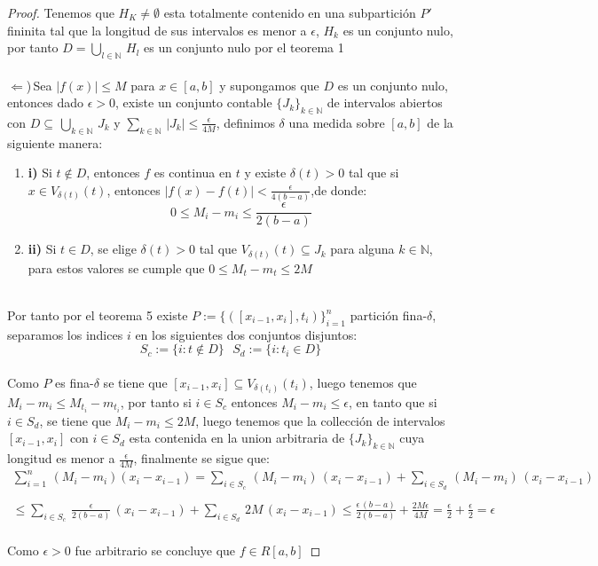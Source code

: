 \documentclass[11pt,letterpaper]{article}
\newcommand{\N}{\mathbb{N}}
\begin{document}
\begin{proof}
    Tenemos que $H_K\neq \emptyset$ esta totalmente contenido en una subpartici\'on $P'$ fininita tal que la longitud de sus intervalos es menor a $\epsilon$,  $H_k$ es un conjunto nulo, por tanto $D=\bigcup_{l\in \N}\,H_l$
    es un conjunto nulo por el teorema 1\,\\
    \,\\
    $\Leftarrow$)\,Sea $|f(x)|\leq M$ para $x\in [a,b]$ y supongamos que $D$ es un conjunto nulo, entonces dado $\epsilon>0$, existe un conjunto contable $\{J_k\}_{k\in \N}$ de intervalos abiertos con $D\subseteq\,\bigcup_{k\in \N}\,J_k$ y $\sum_{k\in \N}\,|J_k|\leq \frac{\epsilon}{4M}$, definimos $\delta$ una medida sobre $[a,b]$ de la siguiente manera:\,\\
    \begin{enumerate}
        \item \textbf{i)}\,\,Si $t \notin D$, entonces $f$ es continua en $t$ y existe $\delta(t)>0$ tal que si $x\in V_{\delta(t)}(t)$, entonces $|f(x)-f(t)|<\frac{\epsilon}{4(b-a)}$,de donde:\,\\
        \begin{equation*}
            0\leq M_i-m_i\leq \frac{\epsilon}{2(b-a)}
        \end{equation*}
        \item \textbf{ii)}\,\,Si $t\in D$, se elige $\delta(t)>0$ tal que $V_{\delta(t)}(t)\subseteq J_k$ para alguna $k\in \N$, para estos valores se cumple que $0\leq M_t-m_t\leq 2M$
    \end{enumerate}\,\\
    Por tanto por el teorema 5 existe $P:=\{([x_{i-1},x_i],t_i)\}_{i=1}^{n}$ partici\'on fina-$\delta$, separamos los indices $i$ en los siguientes dos conjuntos disjuntos:\,\\
    \begin{equation*}
        S_c:=\{i:t\notin D\}\,\,\,\,S_d:=\{i:t_i\in D\}
    \end{equation*}\,\\
    Como $P$ es fina-$\delta$ se tiene que $[x_{i-1},x_i]\subseteq V_{\delta(t_i)}(t_i)$, luego tenemos que $M_i-m_i\leq M_{t_i}-m_{t_i}$, por tanto si $i\in S_c$ entonces $M_i-m_i\leq \epsilon$, en tanto que si $i\in S_d$, se tiene que $M_i-m_i\leq 2M$, luego
    tenemos que la collecci\'on de intervalos $[x_{i-1},x_i]$ con $i\in S_d$ esta contenida en la union arbitraria de $\{J_k\}_{k\in \N}$ cuya longitud es menor a $\frac{\epsilon}{4M}$, finalmente se sigue que:\,\\
    \begin{align*}
        \sum_{i=1}^n\,(M_i-m_i)(x_i-x_{i-1})=\sum_{i\in S_c}\,(M_i-m_i)\,(x_i-x_{i-1})+\sum_{i\in S_d}\,(M_i-m_i)\,(x_i-x_{i-1})\,\\
        \,\\
        \leq \sum_{i\in S_c}\,\frac{\epsilon}{2(b-a)}\,(x_i-x_{i-1})+\sum_{i\in S_d}\,2M\,(x_i-x_{i-1})\leq \frac{\epsilon\,(b-a)}{2(b-a)}+\frac{2M\epsilon}{4M}=\frac{\epsilon}{2}+\frac{\epsilon}{2}=\epsilon
    \end{align*}\,\\
    Como $\epsilon>0$ fue arbitrario se concluye que $f\in R[a,b]$
\end{proof}
\end{document}
